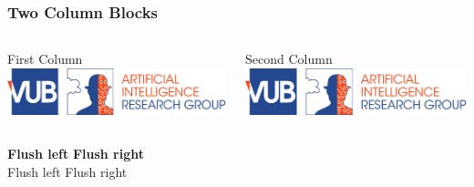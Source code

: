 \begin{frame}
  \frametitle{Two Column Blocks}
  \begin{columns}
    \begin{column}{0.5\textwidth}
      \begin{block}{First Column}
        \includegraphics[width=\textwidth]{images/test.pdf}
      \end{block}
    \end{column}
    \begin{column}{0.5\textwidth}
      \begin{block}{Second Column}
        \includegraphics[width=\textwidth]{images/test.pdf}
      \end{block}
    \end{column}
  \end{columns}
  \vfill
  \textbf{Flush left} \hfill \textbf{Flush right} \\
  Flush left \hfill Flush right
\end{frame}
